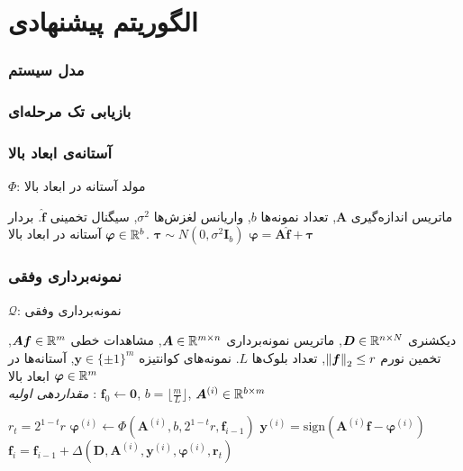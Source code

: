 \section{الگوریتم پیشنهادی\hfill}
\begin{frame}
\frametitle{مدل سیستم}

\begin{figure}
	\centering
	
\end{figure}

\end{frame}
\begin{frame}
\frametitle{بازیابی تک مرحله‌ای}

\end{frame}
\begin{frame}
\frametitle{آستانه‌ی ابعاد بالا}
\begin{algorithm}[H]
	\caption{$ \Phi $: مولد آستانه در ابعاد بالا}
	\label{alg:HDTG}
	\begin{algorithmic}[1]
		\renewcommand{\algorithmicrequire}{\textbf{ورودی:}}
		\renewcommand{\algorithmicensure}{\textbf{خروجی:}}
		\REQUIRE ماتریس اندازه‌گیری $ \bm{A} $, تعداد نمونه‌ها $ b $, واریانس لغزش‌ها $ \sigma^{2} $, سیگنال تخمینی $ \hat{\bm{f}} $.
		\ENSURE بردار آستانه در ابعاد بالا $\bm{\varphi}\in \mathbb{R}^{b}$.
		\STATE $ \bm{\tau}\sim N(0,\sigma^{2}\bm{I}_{b} ) $
		\STATE  $ \bm{\varphi}=\bm{A}\hat{\bm{f}}+\bm{\tau} $
	\end{algorithmic} 
\end{algorithm}
\end{frame}
\begin{frame}
\frametitle{نمونه‌برداری وفقی}
\begin{algorithm}[H]
	\caption{$ \mathcal{Q} $: نمونه‌برداری وفقی}
	\label{alg:AQ}
	\begin{algorithmic}[1]
		\renewcommand{\algorithmicrequire}{\textbf{ورودی:}}
		\renewcommand{\algorithmicensure}{\textbf{خروجی:}}
		\REQUIRE دیکشنری $ \bm{D}\in\mathbb{R}^{n\times N} $, ماتریس نمونه‌برداری $ \bm{A}\in\mathbb{R}^{m\times n} $, مشاهدات خطی $ \bm{Af}\in \mathbb{R}^{m} $, تخمین نورم $ \left\lVert\bm{f}\right\rVert_{2}\leq r $, تعداد بلوک‌ها $ L $.
		\ENSURE  نمونه‌های کوانتیزه $ \bm{y} \in \lbrace\pm 1\rbrace^{m} $, آستانه‌ها در ابعاد بالا $ \bm{\varphi} \in \mathbb{R}^{m} $
		\\ \textit{مقدار‌دهی اولیه} : $ \bm{f}_{0}\leftarrow \bm{0} $, $ b = \lfloor\frac{m}{L}\rfloor $, $ \bm{A}^{(i)}\in \mathbb{R}^{b\times m}  $
		\begin{latin}
		\STATE $r_{t}=2^{1-t}r$
		\STATE $\bm{\varphi}^{\left(i\right)}\leftarrow \Phi(\bm{A}^{(i)},b,2^{1-t}r,\bm{f}_{i-1}) $
		\STATE $ \bm{y}^{\left(i\right)} = \text{sign}\left(\bm{A}^{(i)}\bm{f}-\bm{\varphi}^{\left(i\right)}\right)$
		\STATE $ \bm{f}_{i} = \bm{f}_{i-1} + \varDelta\left(\bm{D},\bm{A}^{(i)},\bm{y}^{\left(i\right)},\bm{\varphi}^{\left(i\right)},\bm{r}_{t}\right) $
		\ENDFOR
		\end{latin}
	\end{algorithmic} 
\end{algorithm}
\end{frame}

